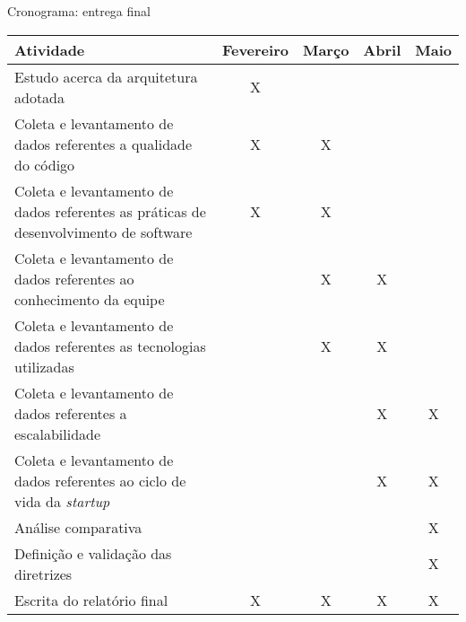 \begin{quadro}
    \caption{Cronograma: entrega final\label{quad:CronogramaTCC2}}
    \begin{tabular}{ | m{8cm} | c | c | c | c | }
    \hline
    \textbf{Atividade} &
        \textbf{Fevereiro} &
        \textbf{Março} &
        \textbf{Abril} &
        \textbf{Maio} \\ \hline
    Estudo acerca da arquitetura adotada &
        X &
        &
        &
        \\ \hline
    Coleta e levantamento de dados referentes a qualidade do código &
        X &
        X &
        &
        \\ \hline
    Coleta e levantamento de dados referentes as práticas de desenvolvimento de software &
        X &
        X &
        &
        \\ \hline
    Coleta e levantamento de dados referentes ao conhecimento da equipe &
        &
        X &
        X &
        \\ \hline
    Coleta e levantamento de dados referentes as tecnologias utilizadas &
        &
        X &
        X &
        \\ \hline
    Coleta e levantamento de dados referentes a escalabilidade &
        &
        &
        X &
        X
        \\ \hline
    Coleta e levantamento de dados referentes ao ciclo de vida da \textit{startup} &
        &
        &
        X &
        X
        \\ \hline
    Análise comparativa &
        &
        &
        &
        X
        \\ \hline
    Definição e validação das diretrizes &
        &
        &
        &
        X
        \\ \hline
    Escrita do relatório final &
        X &
        X &
        X &
        X
        \\ \hline
    \end{tabular}
\end{quadro}
